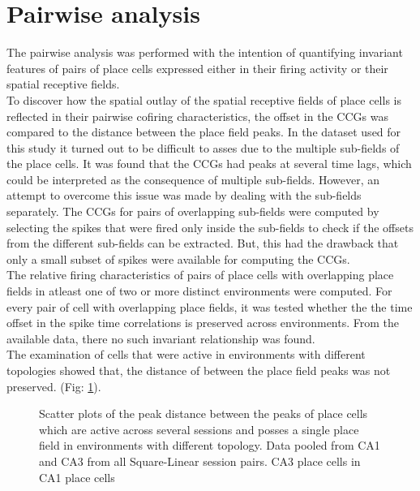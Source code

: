 \section{Pairwise analysis}
The pairwise analysis was performed with the intention of quantifying invariant features of pairs of place cells expressed either in their firing activity or their spatial receptive fields.\\ To discover how the spatial outlay of the spatial receptive fields of place cells is reflected in their pairwise cofiring characteristics, the offset in the CCGs was compared to the distance between the place field peaks. In the dataset used for this study it turned out to be difficult to asses due to the multiple sub-fields of the place cells. It was found that the CCGs had peaks at several time lags, which could be interpreted as the consequence of multiple sub-fields. However, an attempt to overcome this issue was made by dealing with the sub-fields separately.  The CCGs for pairs of overlapping sub-fields were computed by selecting the spikes that were fired only inside the sub-fields to check if the offsets from the different sub-fields can be extracted. But, this had the drawback that only a small subset of spikes were available for computing the CCGs. \\

The relative firing characteristics of pairs of place cells with overlapping place fields in atleast one of  two or more distinct environments were computed. For every pair of cell with overlapping place fields, it was tested whether the the time offset in the spike time correlations is preserved across environments. From the available data, there no such invariant relationship  was found.  \\
The examination of cells that were active in environments with different topologies showed that, the distance of between the place field peaks was not preserved. (Fig: \ref{fig:pkDist}).



\begin{figure}[htb!]
\centering
{}
\caption[Place field Peak distances]{Scatter plots of the peak distance between the peaks of place cells which are active across several sessions and posses a single place field in environments with different topology. Data pooled from CA1 and CA3  from all Square-Linear session pairs.   CA3 place cells in   CA1 place cells }
\label{fig:pkDist}
\end{figure}

